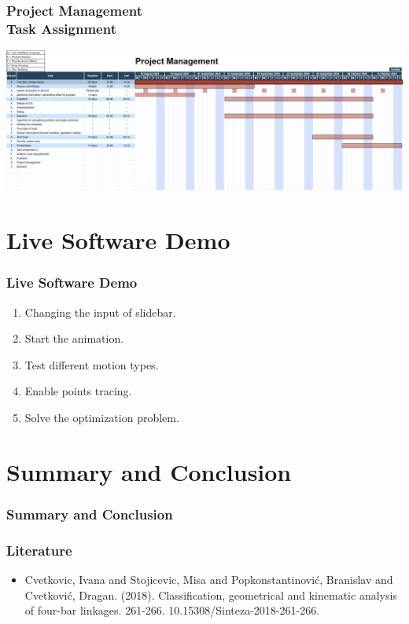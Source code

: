 \documentclass[ucs,10pt]{beamer}
\begin{document}
\begin{frame}
\frametitle{Project Management \\
	\small \color{rwth-blue} Task Assignment}

	\begin{flushleft}
		\includegraphics[height=\textheight,keepaspectratio]{./figures/project management 10-18.png}
	\end{flushleft}
\end{frame}

\section{Live Software Demo}

\begin{frame}
\frametitle{Live Software Demo}

    \begin{enumerate}
        \item Changing the input of slidebar.
        \item Start the animation.
        \item Test different motion types.
        \item Enable points tracing.
        \item Solve the optimization problem.
    \end{enumerate}

\end{frame}

\section{Summary and Conclusion}

\begin{frame}
\frametitle{Summary and Conclusion}
\end{frame}

\begin{frame}
\frametitle{Literature}
	\begin{itemize}
		\item Cvetkovic, Ivana and Stojicevic, Misa and Popkonstantinović, Branislav and Cvetković, Dragan. (2018). Classification, geometrical and kinematic analysis of four-bar linkages. 261-266. 10.15308/Sinteza-2018-261-266.
	\end{itemize}
\end{frame}
\end{document}
